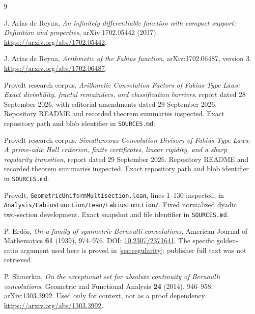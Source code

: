 \documentclass[11pt,letterpaper]{article}
\theoremstyle{definition}
\theoremstyle{remark}
\numberwithin{equation}{section}
\begin{document}
\clearpage
{}
\begin{thebibliography}{9}
\raggedright
{}
J. Arias de Reyna, \emph{An infinitely differentiable function with compact support: Definition and properties}, arXiv:1702.05442 (2017).\newline
\url{https://arxiv.org/abs/1702.05442}.

J. Arias de Reyna, \emph{Arithmetic of the Fabius function}, arXiv:1702.06487, version 3.\newline
\url{https://arxiv.org/abs/1702.06487}.

ProveIt research corpus, \emph{Arithmetic Convolution Factors of Fabius-Type Laws: Exact divisibility, fractal remainders, and classification barriers}, report dated 28 September 2026, with editorial amendments dated 29 September 2026. Repository README and recorded theorem summaries inspected. Exact repository path and blob identifier in \texttt{SOURCES.md}.

ProveIt research corpus, \emph{Simultaneous Convolution Divisors of Fabius-Type Laws: A prime-adic Hall criterion, finite certificates, linear rigidity, and a sharp regularity transition}, report dated 29 September 2026. Repository README and recorded theorem summaries inspected. Exact repository path and blob identifier in \texttt{SOURCES.md}.

ProveIt, \texttt{GeometricUniformMultisection.lean}, lines 1--130 inspected, in \nolinkurl{Analysis/FabiusFunction/Lean/FabiusFunction/}. Fixed normalized dyadic two-section development. Exact snapshot and file identifier in \texttt{SOURCES.md}.

P. Erd\H{o}s, \emph{On a family of symmetric Bernoulli convolutions}, American Journal of Mathematics \textbf{61} (1939), 974--976. DOI: \href{https://doi.org/10.2307/2371641}{10.2307/2371641}. The specific golden-ratio argument used here is proved in \cref{sec:regularity}; publisher full text was not retrieved.

P. Shmerkin, \emph{On the exceptional set for absolute continuity of Bernoulli convolutions}, Geometric and Functional Analysis \textbf{24} (2014), 946--958; arXiv:1303.3992. Used only for context, not as a proof dependency.\newline
\url{https://arxiv.org/abs/1303.3992}.
\end{thebibliography}
\end{document}
